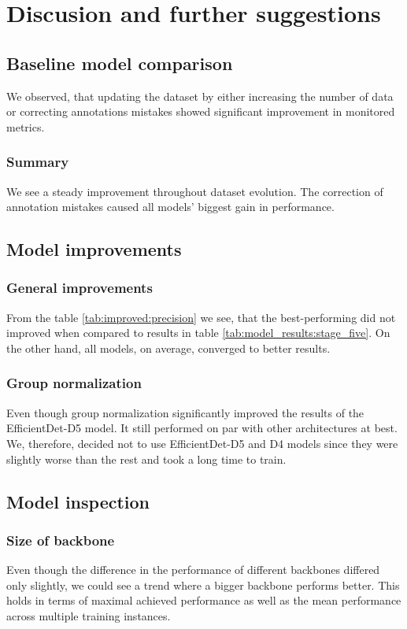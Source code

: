 \chapter{Discusion and further suggestions}
\label{chapter:discusion}

\section{Baseline model comparison}
We observed, that updating the dataset by either increasing the number of data or correcting annotations mistakes showed significant improvement in monitored metrics.


\subsection{Summary}
We see a steady improvement throughout dataset evolution. The correction of annotation mistakes caused all models' biggest gain in performance.

\section{Model improvements}
\subsection{General improvements}
From the table \ref{tab:improved:precision} we see, that the best-performing did not improved when compared to results in table \ref{tab:model_results:stage_five}. On the other hand, all models, on average, converged to better results.

\subsection{Group normalization}
Even though group normalization significantly improved the results of the EfficientDet-D5 model. It still performed on par with other architectures at best. We, therefore, decided not to use EfficientDet-D5 and D4 models since they were slightly worse than the rest and took a long time to train.

\section{Model inspection}
\subsection{Size of backbone}
Even though the difference in the performance of different backbones differed only slightly, we could see a trend where a bigger backbone performs better. This holds in terms of maximal achieved performance as well as the mean performance across multiple training instances.

